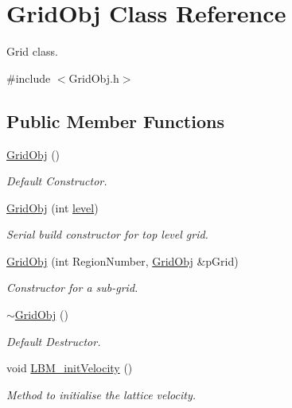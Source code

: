 \hypertarget{class_grid_obj}{}\section{Grid\+Obj Class Reference}
\label{class_grid_obj}


Grid class.  




{\ttfamily \#include $<$Grid\+Obj.\+h$>$}

\subsection*{Public Member Functions}
\begin{DoxyCompactItemize}
\item 
\hyperlink{class_grid_obj_acc3416599b59236e87b6b60a07e678af}{Grid\+Obj} ()
\begin{DoxyCompactList}\small\item\em Default Constructor. \end{DoxyCompactList}\item 
\hyperlink{class_grid_obj_aaadde3417da5f31e1b8b33635487b56e}{Grid\+Obj} (int \hyperlink{class_grid_obj_a7dfedc4442a386ec15c8b03ca899c1a9}{level})
\begin{DoxyCompactList}\small\item\em Serial build constructor for top level grid. \end{DoxyCompactList}\item 
\hyperlink{class_grid_obj_a40600a8b8a286b8299bca8265b62f51b}{Grid\+Obj} (int Region\+Number, \hyperlink{class_grid_obj}{Grid\+Obj} \&p\+Grid)
\begin{DoxyCompactList}\small\item\em Constructor for a sub-\/grid. \end{DoxyCompactList}\item 
\hyperlink{class_grid_obj_ace563099d85c330ac48f35b515422522}{$\sim$\+Grid\+Obj} ()
\begin{DoxyCompactList}\small\item\em Default Destructor. \end{DoxyCompactList}\item 
void \hyperlink{class_grid_obj_aa8041f7344af6cf9732199aa107fdbc6}{L\+B\+M\+\_\+init\+Velocity} ()
\begin{DoxyCompactList}\small\item\em Method to initialise the lattice velocity. \end{DoxyCompactList}\item 

\end{DoxyCompactItemize}
